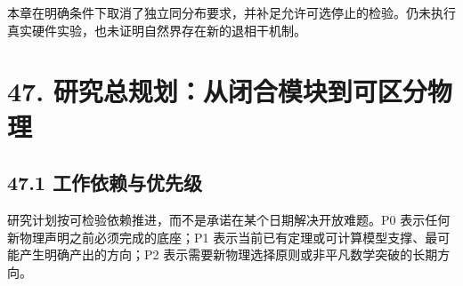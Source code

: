 \documentclass[
  11pt,
  oneside]{book}
\begin{document}
本章在明确条件下取消了独立同分布要求，并补足允许可选停止的检验。仍未执行真实硬件实验，也未证明自然界存在新的退相干机制。

\hypertarget{ch-47}{%
\chapter{47. 研究总规划：从闭合模块到可区分物理}\label{ch-47}}

\hypertarget{ux5de5ux4f5cux4f9dux8d56ux4e0eux4f18ux5148ux7ea7}{%
\section{47.1
工作依赖与优先级}\label{ux5de5ux4f5cux4f9dux8d56ux4e0eux4f18ux5148ux7ea7}}

研究计划按可检验依赖推进，而不是承诺在某个日期解决开放难题。P0
表示任何新物理声明之前必须完成的底座；P1
表示当前已有定理或可计算模型支撑、最可能产生明确产出的方向；P2
表示需要新物理选择原则或非平凡数学突破的长期方向。
\end{document}

